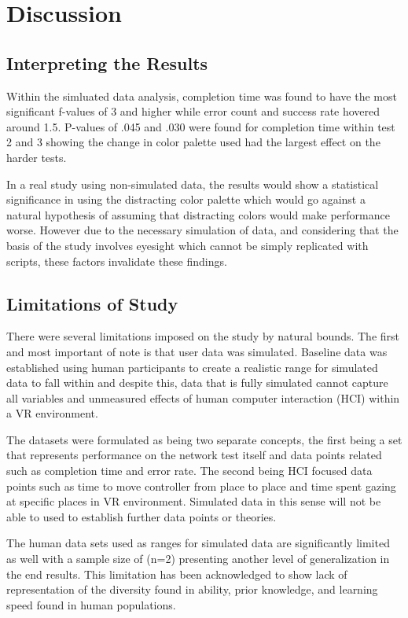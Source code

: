 \documentclass[acmlarge]{acmart}
\begin{document}
\section{Discussion}
\subsection{Interpreting the Results}
Within the simluated data analysis, completion time was found to have the most significant f-values of 3 and higher while error count and success rate hovered around 1.5. P-values of .045 and .030 were found for completion time within test 2 and 3 showing the change in color palette used had the largest effect on the harder tests.

In a real study using non-simulated data, the results would show a statistical significance in using the distracting color palette which would go against a natural hypothesis of assuming that distracting colors would make performance worse. However due to the necessary simulation of data, and considering that the basis of the study involves eyesight which cannot be simply replicated with scripts, these factors invalidate these findings. 

\subsection{Limitations of Study}
There were several limitations imposed on the study by natural bounds. The first and most important of note is that user data was simulated. Baseline data was established using human participants to create a realistic range for simulated data to fall within and despite this, data that is fully simulated cannot capture all variables and unmeasured effects of human computer interaction (HCI) within a VR environment.

The datasets were formulated as being two separate concepts, the first being a set that represents performance on the network test itself and data points related such as completion time and error rate. The second being HCI focused data points such as time to move controller from place to place and time spent gazing at specific places in VR environment. Simulated data in this sense will not be able to used to establish further data points or theories.

The human data sets used as ranges for simulated data are significantly limited as well with a sample size of  (n=2) presenting another level of generalization in the end results. This limitation has been acknowledged to show lack of representation of the diversity found in ability, prior knowledge, and learning speed found in human populations.
\end{document}
